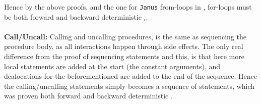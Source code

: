 Hence by the above proofs, and the one for \texttt{Janus} from-loops in \cite{janus}, \lan
for-loops must be both forward and backward deterministic $_\square$.
\\
\\
\textbf{Call/Uncall:}
Calling and uncalling procedures,
is the same as sequencing the procedure body, as all interactions happen through side effects.
The only real difference
from the proof of sequencing statements and this, is that here more local statements are added at
the start (the constant arguments), and dealocations for the beforementioned are added to the end
of the sequence. Hence the calling/uncalling statements simply becomes a sequence of statements,
which was proven both forward and backward deterministic \cite{janus}.